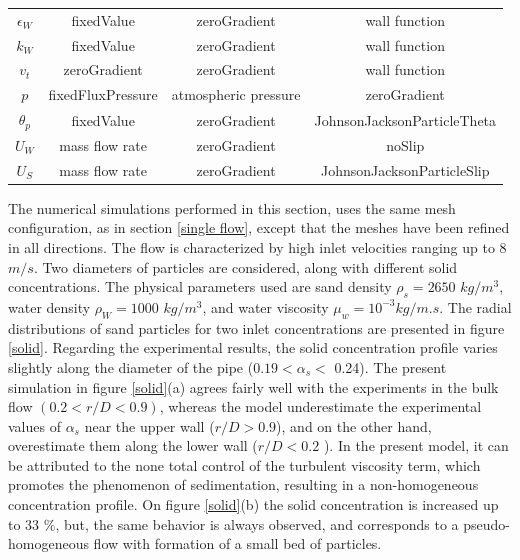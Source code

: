 \documentclass[11pt]{report}
\begin{document}
\begin{minipage}[t]{0.35\textwidth}
\begin{minipage}[t]{0.5\textwidth}
\begin{minipage}[t]{0.35\textwidth}
\begin{minipage}[t]{0.35\textwidth}
\begin{table}[ht!]
\begin{center}
\begin{tabular}{cccc}
 \(\epsilon_{W}\) & fixedValue & zeroGradient & wall function\\
 \(k_{W}\) & fixedValue & zeroGradient & wall function \\
 \(v_{t}\) & zeroGradient & zeroGradient &  wall function \\
 \(p\) & fixedFluxPressure & atmospheric pressure & zeroGradient \\
 \(\theta_{p}\) & fixedValue & zeroGradient & JohnsonJacksonParticleTheta\\
 \(U_{W}\) & mass flow rate  & zeroGradient & noSlip\\
 \(U_{S}\) & mass flow rate  & zeroGradient & JohnsonJacksonParticleSlip  \\
 \hline
 \end{tabular}
 \end{center}
 \end{table}
%
The numerical simulations performed in this section, uses the same mesh configuration, as in section \ref{single flow}, except that the meshes have been refined in all directions. 
%
The flow is characterized by high inlet velocities ranging up to 8 $m/s$. 
%
Two diameters of particles are considered, along with different solid concentrations. 
%
The physical parameters used are sand density $\rho_s=2650$ $kg/m^3$, water density $\rho_W=1000$ $kg/m^3$, and water viscosity $\mu_w= 10^{-3} kg/m.s$. 
%
The radial distributions of sand particles for two inlet concentrations are presented in figure \ref{solid}. 
%
Regarding the experimental results, the solid concentration profile varies slightly along the diameter of the pipe ($ 0.19 <\alpha_s <$ 0.24). 
%
The present simulation in figure \ref{solid}(a) agrees fairly well with the experiments in the bulk flow $(0.2<r/D <0.9)$, whereas the model underestimate the experimental values of $ \alpha_s $ near the upper wall ($ r / D> 0.9 $), and on the other hand, 
%
overestimate them along the lower wall ($ r / D <0.2 $ ). In the present model, it can be attributed to the none total control of the turbulent viscosity term, which promotes the phenomenon of sedimentation, resulting in a non-homogeneous concentration profile. 
%
On figure \ref{solid}(b) the solid concentration is increased up to $33$ $\%$, but, the same behavior is always observed, and corresponds to a pseudo-homogeneous flow with formation of a small bed of particles.  \\
%
\begin{figure}[ht!]
 \begin{center}

\end{center}
\end{figure}
\end{minipage}
\end{minipage}
\end{minipage}
\end{minipage}
\end{document}
